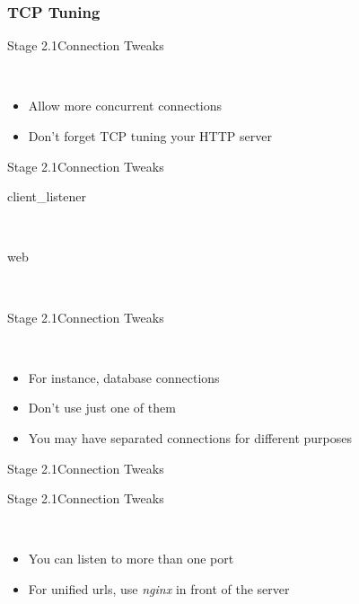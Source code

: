 \documentclass[utf8]{beamer}
\begin{document}
\subsubsection{TCP Tuning}
\begin{frame}{Stage 2.1}{Connection Tweaks}
	\begin{description}
		\item<+->[Backlog]\ \\
			\begin{itemize}
				\item Allow more concurrent connections
				\item Don't forget TCP tuning your HTTP server
			\end{itemize}
	\end{description}
\end{frame}
\begin{frame}{Stage 2.1}{Connection Tweaks}
	\begin{description}
		\item[client\_listener]~\\\backlog
		\item[web]~\\\backlogweb
	\end{description}
\end{frame}
\begin{frame}{Stage 2.1}{Connection Tweaks}
	\begin{description}
		\item<+->[Outbound Connections]\ \\
			\begin{itemize}
				\item For instance, database connections
				\item Don't use just one of them
				\item You may have separated connections for different purposes
			\end{itemize}
	\end{description}
\end{frame}
\begin{frame}{Stage 2.1}{Connection Tweaks}
\end{frame}
\begin{frame}{Stage 2.1}{Connection Tweaks}
	\begin{description}
		\item<+->[Listeners]\ \\
			\begin{itemize}
				\item You can listen to more than one port
				\item For unified urls, use \emph{nginx} in front of the server
			\end{itemize}
	\end{description}
\end{frame}
\end{document}
